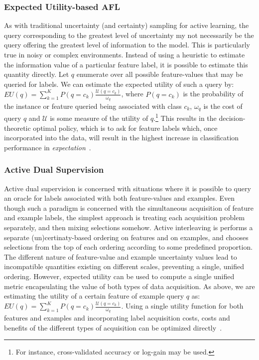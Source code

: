\subsubsection{Expected Utility-based AFL}
\label{sec:euafl}
As with traditional uncertainty (and certainty) sampling for active learning,  the query corresponding to the greatest level of uncertainty my not necessarily be the query offering the greatest level of information to the model. This is particularly true in noisy or complex environments. Instead of using a heuristic to estimate the information value of a particular feature label, it is possible to estimate this quantity directly. Let $q$ enumerate over all possible feature-values that may be queried for labels. We can estimate the expected utility of such a query by: $EU(q) = \sum_{k=1}^{K}{P(q=c_k)\frac{\mathcal{U}(q=c_k)}{\omega_q}}$, where $P(q=c_k)$ is the probability of the instance or feature queried being associated with class $c_k$, $\omega_q$ is the cost of query $q$ and $\mathcal{U}$ is some measure of the utility of $q$.\footnote{For instance, cross-validated accuracy or log-gain may be used.} This results in the decision-theoretic optimal policy, which is to ask for feature labels which, once incorporated into the data, will result in the highest increase in classification performance in \emph{expectation}~\cite{attenberg:ecml10, melville:naacl09}.


\subsubsection{Active Dual Supervision}
\label{sec:ads}

Active dual supervision is concerned with situations where it is possible to query an oracle for labels associated with both feature-values and examples. Even though such a paradigm is concerned with the simultaneous acquisition of feature and example labels, the simplest approach is treating each acquisition problem separately, and then mixing selections somehow. Active interleaving is performs a separate (un)certinaty-based ordering on features and on examples, and chooses selections from the top of each ordering according to some predefined proportion. The different nature of feature-value and example uncertainty values lead to incompatible quantities existing on different scales, preventing a single, unified ordering. However, expected utility can be used to compute a single unified metric encapsulating the value of both types of data acquisition. As above, we are estimating the utility of a certain feature of example query $q$ as: $EU(q) = \sum_{k=1}^{K}{P(q=c_k)\frac{\mathcal{U}(q=c_k)}{\omega_q}}$. Using a single utility function for both features and examples and incorporating label acquisition costs, costs and benefits of the different types of acquisition can be optimized directly~\cite{attenberg:ecml10}.



